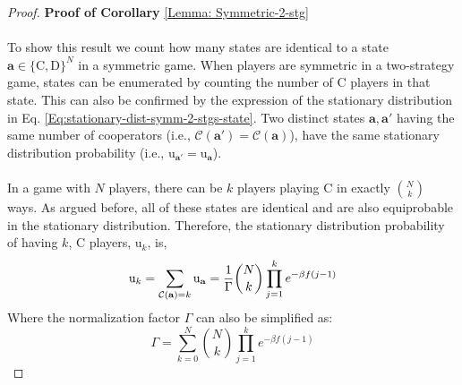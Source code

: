 \documentclass[11pt]{article}
\theoremstyle{plainCl1}
\theoremstyle{plainCl2}
\newcommand{\abf}{\mathbf{a}}
\newcommand{\C}{\mathrm{C}}
\newcommand{\D}{\mathrm{D}}
\begin{document}
\begin{proof}
\textbf{Proof of Corollary} \ref{Lemma: Symmetric-2-stg} \\ \\
To show this result we count how many states are identical to a state $\abf \in \{\C,\D\}^N$ in a symmetric game. When players are symmetric in a two-strategy game, states can be enumerated by counting the number of $\C$ players in that state. This can also be confirmed by the expression of the stationary distribution in Eq. \ref{Eq:stationary-dist-symm-2-stgs-state}. Two distinct states $\abf, \abf'$ having the same number of cooperators (i.e., $\mathcal{C}(\abf') = \mathcal{C}(\abf)$), have the same stationary distribution probability (i.e., $\mathrm{u}_{\abf'} = \mathrm{u}_{\abf}$).
\\ \\ 
\noindent In a game with $N$ players, there can be $k$ players playing $\C$ in exactly $N \choose k$ ways. As argued before, all of these states are identical and are also equiprobable in the stationary distribution. Therefore, the stationary distribution probability of having $k$, $\C$ players, $\mathrm{u}_{k}$, is,
\begin{equation}
\mathrm{u}_{k} = \sum_{\mathcal{C(\abf)} = k} \mathrm{u}_\abf = \frac{1}{\Gamma} {N \choose k} \prod_{j=1}^k e^{-\beta f(j-1)} \\[10pt]
\end{equation} 
\noindent Where the normalization factor $\Gamma$ can also be simplified as: 
\begin{equation}
\Gamma = \sum_{k=0}^N {N \choose k} \prod_{j=1}^k e^{-\beta f(j-1)}
\end{equation}
\end{proof}
\newpage
\end{document}
